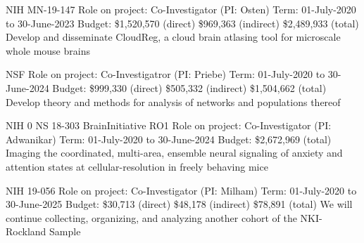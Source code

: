 \documentclass[10pt,colorlinks=true,urlcolor=blue]{moderncv}
\begin{document}
{\newline NIH MN-19-147
\newline Role on project: Co-Investigator (PI: Osten)
\newline Term: 01-July-2020 to 30-June-2023
\newline Budget: \$1,520,570 (direct) \$969,363 (indirect) \$2,489,933 (total)
\newline Develop and disseminate CloudReg, a cloud brain atlasing tool for microscale whole
mouse brains}{}{}{}{}

{\newline NSF
\newline Role on project: Co-Investigatror (PI: Priebe)
\newline Term: 01-July-2020 to 30-June-2024
\newline Budget: \$999,330 (direct) \$505,332 (indirect) \$1,504,662 (total)
\newline Develop theory and methods for analysis of networks and populations thereof}{}{}{}{}

{\newline NIH 0 NS 18-303 BrainInitiative RO1
\newline Role on project: Co-Investigator (PI: Adwanikar)
\newline Term: 01-July-2020 to 30-June-2024
\newline Budget: \$2,672,969 (total)
\newline Imaging the coordinated, multi-area, ensemble neural signaling of anxiety and attention
states at cellular-resolution in freely behaving mice}{}{}{}{}

{\newline NIH 19-056
\newline Role on project: Co-Investigator (PI: Milham)
\newline Term: 01-July-2020 to 30-June-2025
\newline Budget: \$30,713 (direct) \$48,178 (indirect) \$78,891 (total)
\newline We will continue collecting, organizing, and analyzing another cohort of the NKI-Rockland
Sample}{}{}{}{}
\end{document}

